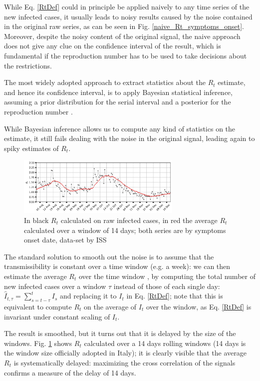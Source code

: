 \documentclass[graybox]{svmult}
\begin{document}
While Eq. \ref{RtDef} could in principle be applied naively to any time series of the new infected cases, it usually leads to noisy results caused by the noise contained in the original raw series, as can be seen in Fig. \ref{naive_Rt_symptoms_onset}. Moreover, despite the noisy content of the original signal, the naive approach does not give any clue on the confidence interval of the result, which is fundamental if the reproduction number has to be used to take decisions about the restrictions.

The most widely adopted approach to extract statistics about the $R_t$ estimate, and hence its confidence interval, is to apply Bayesian statistical inference, assuming a prior distribution for the serial interval and a posterior for the reproduction number \cite{CorietAl2013}. 

While Bayesian inference allows us to compute any kind of statistics on the estimate, it still fails  dealing with the noise in the original signal, leading again to spiky estimates of $R_t$.

\begin{figure}[t]
\center
\includegraphics[width=0.7\textwidth]{Rt_images/naive_Rt_symptoms_onset_window_14.jpg}
\caption{In black $R_t$ calculated on raw infected cases, in red the average $R_t$ calculated over a window of 14 days; both series are by symptoms onset date, data-set by ISS}
\label{naive_Rt_symptoms_onset_window_14}
\end{figure}

The standard solution to smooth out the noise is to assume that the transmissibility is constant over a time window (e.g. a week): we can then estimate the average $R_t$ over the time window \cite{CorietAl2013}, by computing the total number of new infected cases over a window $\tau$ instead of those of each single day: $\hat{I}_{t,\tau}=\sum_{s=t-\tau}^{t} I_s$ and replacing it to $I_t$ in Eq. \ref{RtDef}; note that this is equivalent to compute $R_t$ on the average of $I_t$ over the window, as Eq. \ref{RtDef} is invariant under constant scaling of $I_t$. 

The result is smoothed, but it turns out that it is delayed by the size of the windows. Fig. \ref{naive_Rt_symptoms_onset_window_14} shows $R_t$ calculated over a 14 days rolling windows (14 days is the window size officially adopted in Italy); it is clearly visible that the average $R_t$ is systematically delayed: maximizing the cross correlation of the signals confirms a measure of the delay of 14 days.
\end{document}
